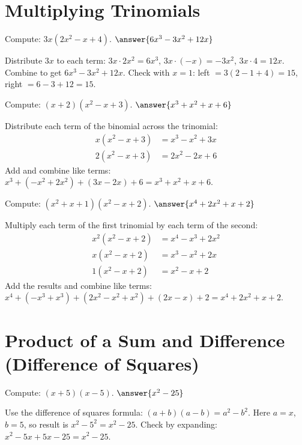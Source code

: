 \documentclass{ximera}
\begin{document}
\section*{Multiplying Trinomials}

\begin{problem}
Compute: \(3x(2x^2 - x + 4)\). $\answer{6x^3 - 3x^2 + 12x}$
\begin{feedback}
Distribute \(3x\) to each term: \(3x\cdot2x^2=6x^3\), \(3x\cdot(-x)=-3x^2\), \(3x\cdot4=12x\). Combine to get \(6x^3-3x^2+12x\). Check with \(x=1\): left \(=3(2-1+4)=15\), right \(=6-3+12=15\).
\end{feedback}
\end{problem}

\begin{problem}
Compute: \((x + 2)(x^2 - x + 3)\). $\answer{x^3 + x^2 + x + 6}$
\begin{feedback}
Distribute each term of the binomial across the trinomial:
\[
\begin{aligned}
x(x^2 - x + 3) &= x^3 - x^2 + 3x\\
2(x^2 - x + 3) &= 2x^2 - 2x + 6
\end{aligned}
\]
Add and combine like terms: \(x^3 + (-x^2+2x^2) + (3x-2x) + 6 = x^3 + x^2 + x + 6\).
\end{feedback}
\end{problem}

\begin{problem}
Compute: \((x^2 + x + 1)(x^2 - x + 2)\). $\answer{x^4 + 2x^2 + x + 2}$
\begin{feedback}
Multiply each term of the first trinomial by each term of the second:
\[
\begin{aligned}
x^2(x^2 - x + 2) &= x^4 - x^3 + 2x^2\\
x(x^2 - x + 2) &= x^3 - x^2 + 2x\\
1(x^2 - x + 2) &= x^2 - x + 2
\end{aligned}
\]
Add the results and combine like terms:
\(x^4 + (-x^3+x^3) + (2x^2 - x^2 + x^2) + (2x - x) + 2 = x^4 + 2x^2 + x + 2\).
\end{feedback}
\end{problem}

\section*{Product of a Sum and Difference (Difference of Squares)}

\begin{problem}
Compute: \((x + 5)(x - 5)\). $\answer{x^2 - 25}$
\begin{feedback}
Use the difference of squares formula: \((a+b)(a-b)=a^2-b^2\). Here \(a=x\), \(b=5\), so result is \(x^2-5^2=x^2-25\). Check by expanding: \(x^2-5x+5x-25=x^2-25\).
\end{feedback}
\end{problem}
\end{document}
